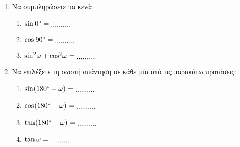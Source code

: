 \documentclass[12pt,a4page]{article}
\def\defaultDots{10}
\begin{document}
\begin{schltask}[label=\normalsize\bf\letterspace{\defaultletterspace}ΘΕΩΡΙΑ\ \arabic*,itemsep=2ex,leftmargin=-5pt]
  \newpage
\item \leavevmode\\[-1.5\baselineskip]
  \begin{enumerate}[label=\bf\Alph*.,itemsep=4ex]
  \item Να συμπληρώσετε τα κενά:
    \begin{enumerate}[label=\bf\arabic*\hspace{1pt}),itemsep=2ex]
    \item $\sin 0^\circ = \lowerdots{\defaultDots}$\\
    \item $\cos 90^\circ = \lowerdots{\defaultDots}$\\
    \item ${\sin}^2\omega + {\cos}^2\omega =  \lowerdots{\defaultDots}$
    \end{enumerate}

  \item Να επιλέξετε τη σωστή απάντηση σε κάθε μία από τις παρακάτω προτάσεις:
    \begin{enumerate}[label=\bf\arabic*\hspace{1pt}),itemsep=4ex]
    \item $\sin( {180}^\circ - \omega ) = \lowerdots{\defaultDots}$\\
      \begin{multichoice}
      \item $\sin\omega$
      \item $-\sin\omega$
      \end{multichoice}
    \item $\cos( {180}^\circ - \omega ) = \lowerdots{\defaultDots}$\\
      \begin{multichoice}
      \item $\cos\omega$
      \item $-\cos\omega$
      \end{multichoice}
    \item $\tan( {180}^\circ - \omega ) = \lowerdots{\defaultDots}$\\
      \begin{multichoice}
      \item $\tan\omega$
      \item $-\tan\omega$
      \end{multichoice}
    \item $\tan\omega = \lowerdots{\defaultDots}$\\
      {\large
        \begin{multichoice}
        \item $\frac{\sin\omega}{\cos\omega}$
        \item $\frac{\cos\omega}{\sin\omega}$
        \end{multichoice}
      }
    \end{enumerate}


\end{enumerate}
\end{schltask}
\end{document}
